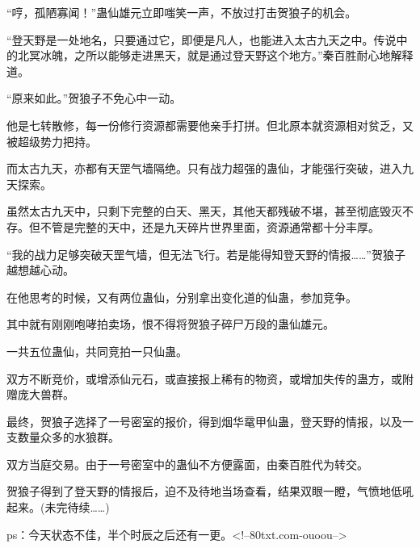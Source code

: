 \begin{this_body}
“哼，孤陋寡闻！”蛊仙雄元立即嗤笑一声，不放过打击贺狼子的机会。

“登天野是一处地名，只要通过它，即便是凡人，也能进入太古九天之中。传说中的北冥冰魄，之所以能够走进黑天，就是通过登天野这个地方。”秦百胜耐心地解释道。

“原来如此。”贺狼子不免心中一动。

他是七转散修，每一份修行资源都需要他亲手打拼。但北原本就资源相对贫乏，又被超级势力把持。

而太古九天，亦都有天罡气墙隔绝。只有战力超强的蛊仙，才能强行突破，进入九天探索。

虽然太古九天中，只剩下完整的白天、黑天，其他天都残破不堪，甚至彻底毁灭不存。但不管是完整的天中，还是九天碎片世界里面，资源通常都十分丰厚。

“我的战力足够突破天罡气墙，但无法飞行。若是能得知登天野的情报……”贺狼子越想越心动。

在他思考的时候，又有两位蛊仙，分别拿出变化道的仙蛊，参加竞争。

其中就有刚刚咆哮拍卖场，恨不得将贺狼子碎尸万段的蛊仙雄元。

一共五位蛊仙，共同竞拍一只仙蛊。

双方不断竞价，或增添仙元石，或直接报上稀有的物资，或增加失传的蛊方，或附赠庞大兽群。

最终，贺狼子选择了一号密室的报价，得到烟华鼋甲仙蛊，登天野的情报，以及一支数量众多的水狼群。

双方当庭交易。由于一号密室中的蛊仙不方便露面，由秦百胜代为转交。

贺狼子得到了登天野的情报后，迫不及待地当场查看，结果双眼一瞪，气愤地低吼起来。(未完待续……)

ps：今天状态不佳，半个时辰之后还有一更。<!--80txt.com-ouoou-->

\end{this_body}

